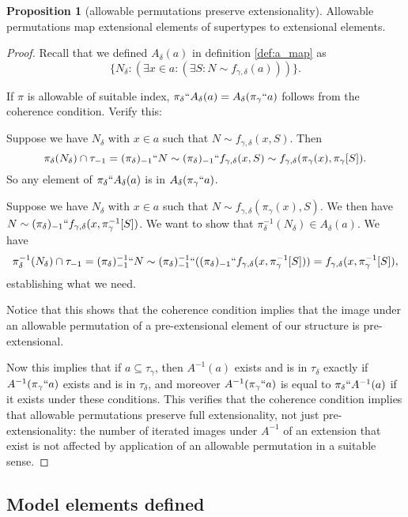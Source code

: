 \documentclass[112pt]{article}
\theoremstyle{definition}
\newtheorem{proposition}[theorem]{Proposition}
\theoremstyle{remark}
\newcommand{\rk}[1]{{\color{blue}\sl #1}}
\begin{document}
\begin{proposition}[allowable permutations preserve extensionality]\label{prop:allowable_preserves_extensionality}
Allowable permutations map extensional elements of supertypes to extensional elements.
\end{proposition}
\begin{proof}
{Recall that} we defined $A_\delta(a)$ {in definition \ref{def:a_map}} as $$\{N_\delta:(\exists x \in a:(\exists S:N \sim f_{\gamma,\delta}(a)))\}.$$

If $\pi$ is allowable of suitable index, $\pi_\delta``A_\delta(a)= A_\delta(\pi_\gamma``a)$ follows from the coherence condition.  Verify this:

Suppose we have $N_\delta$ with $x \in a$ such that $N \sim f_{\gamma,\delta}(x,S)$.  Then $$\pi_\delta(N_\delta)  \cap \tau_{-1} = (\pi_\delta)_{-1}``N \sim (\pi_\delta)_{-1}``f_{\gamma,\delta}(x,S) \sim f_{\gamma,\delta}(\pi_\gamma(x),\pi_\gamma[S]).$$  So any element of $\pi_\delta``A_\delta(a)$ is in $A_\delta(\pi_\gamma``a)$.

Suppose we have $N_\delta$ with $x \in a$ such that $N \sim f_{\gamma,\delta}(\pi_\gamma(x),S)$.  We then have $N \sim (\pi_\delta)_{-1}``f_{\gamma,\delta}(x,\pi_\gamma^{-1}[S])$.  We want to show that $\pi_\delta^{-1}(N_\delta) \in A_\delta(a)$.  We have $$\pi_\delta^{-1}(N_\delta) \cap \tau_{-1} = (\pi_\delta)_{-1}^{-1}``N \sim
(\pi_\delta)_{-1}^{-1}``((\pi_\delta)_{-1}``f_{\gamma,\delta}(x,\pi_\gamma^{-1}[S])) = f_{\gamma,\delta}(x,\pi_\gamma^{-1}[S]),$$ establishing what we need.

Notice that this shows that the coherence condition implies that the image under an allowable permutation of a pre-extensional element of our structure is pre-extensional.

Now this implies that if $a \subseteq \tau_\gamma$, then $A^{-1}(a)$ exists and is in $\tau_\delta$ exactly if $A^{-1}(\pi_\gamma``a)$ exists and is in $\tau_\delta$, and moreover $A^{-1}(\pi_\gamma``a)$ is equal to $\pi_\delta``A^{-1}(a)$ if it exists under these conditions.  This verifies that the coherence condition implies that allowable permutations preserve full extensionality, not just pre-extensionality:  the number of iterated images under $A^{-1}$ of an extension that exist is not affected by application of an allowable permutation in a suitable sense.
\end{proof}

\subsection{Model elements defined}\label{ss:model_elements}
\end{document}
